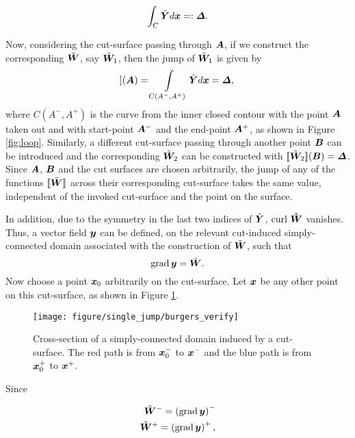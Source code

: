 \documentclass[11pt,letterpaper]{article}
\begin{document}
\begin{equation*}
\int_C \tilde{\bfY} d\bfx =: \bfDelta.
\end{equation*}

Now, considering the cut-surface passing through $\bfA$, if we construct the corresponding $\tilde{\bfW}$, say $\tilde{\bfW}_1 $, then the jump of $\tilde{\bfW}_1$ is given by
\begin{equation*}
[\![ \tilde{\bfW}_1 ]\!] (\bfA) = \int\limits_{C(A^-,A^+)} \tilde{\bfY} d\bfx = \bfDelta,
\end{equation*}
where $C(A^-,A^+)$ is the curve from the inner closed contour with the point $\bfA$ taken out and with start-point $\bfA^-$ and the end-point $\bfA^+$, as shown in Figure \ref{fig:loop}. Similarly, a different cut-surface passing through another point $\bfB$ can be introduced and the corresponding $\tilde{\bfW}_2$ can be constructed with $[\![\tilde{\bfW}_2]\!](\bfB)=\bfDelta$. Since $\bfA$, $\bfB$ and the cut surfaces are chosen arbitrarily, the jump of any of the functions $[\![\tilde{\bfW}]\!]$ across their corresponding cut-surface takes the same value, independent of the invoked cut-surface and the point on the surface. 

In addition, due to the symmetry in the last two indices of $\tilde{\bfY}$, $\curl \, \bf{\tilde\bfW}$ vanishes. Thus, a vector field $\bfy$ can be defined, on the relevant  cut-induced simply-connected domain associated with the construction of $\tilde{\bfW}$, such that 
\begin{equation}\label{y_from_W}
\grad \bfy = \tilde{\bfW}.
 \end{equation} 
 Now choose a point $\bfx_0$ arbitrarily on the cut-surface. Let $\bfx$ be any other point on this cut-surface, as shown in Figure \ref{fig:burgers}. 
 
 \begin{figure}
\centering
\texttt{[image: figure/single\_jump/burgers\_verify]}
\caption{Cross-section of a simply-connected domain induced by a cut-surface. The red path is from $\bfx_0^-$ to $\bfx^-$ and the blue path is from $\bfx_0^+$ to $\bfx^+$.}
\label{fig:burgers}
\end{figure}

Since 

\begin{eqnarray*}
\tilde{\bfW}^- = \left(\grad \bfy\right)^- \\
\tilde{\bfW}^+ = \left(\grad \bfy\right)^+,
\end{eqnarray*}
\end{document}
